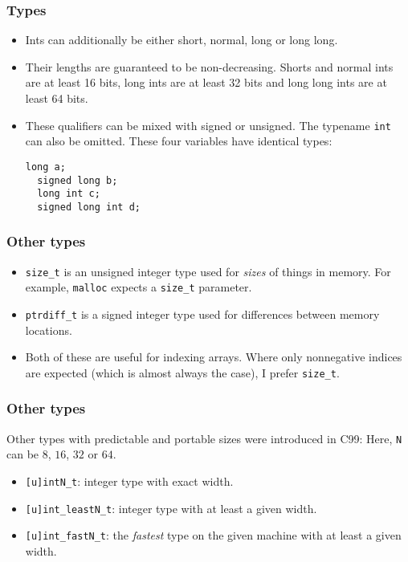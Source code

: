 \begin{frame}[fragile]
  \frametitle{Types}
  \begin{itemize}
  \item Ints can additionally be either short, normal, long or long long.
  \item Their lengths are guaranteed to be non-decreasing. Shorts and normal
    ints are at least 16 bits, long ints are at least 32 bits and long long ints
    are at least 64 bits.
  \item These qualifiers can be mixed with signed or unsigned. The typename
    \texttt{int} can also be omitted. These four variables have identical types:
    \begin{lstlisting}[style=c]
  long a;
  signed long b;
  long int c;
  signed long int d;
    \end{lstlisting}
  \end{itemize}
\end{frame}

\begin{frame}
  \frametitle{Other types}
  \begin{itemize}
  \item \texttt{size\_t} is an unsigned integer type used for \emph{sizes} of
    things in memory. For example, \texttt{malloc} expects a \texttt{size\_t}
    parameter.
  \item \texttt{ptrdiff\_t} is a signed integer type used for differences
    between memory locations.
  \item Both of these are useful for indexing arrays. Where only nonnegative
    indices are expected (which is almost always the case), I prefer
    \texttt{size\_t}.
  \end{itemize}
\end{frame}

\begin{frame}
  \frametitle{Other types}
  Other types with predictable and portable sizes were introduced in C99: Here,
  \texttt{N} can be $8$, $16$, $32$ or $64$.
  \begin{itemize}
  \item \texttt{[u]intN\_t}: integer type with exact width.
  \item \texttt{[u]int\_leastN\_t}: integer type with at least a given width.
  \item \texttt{[u]int\_fastN\_t}: the \emph{fastest} type on the given machine
    with at least a given width.
  \end{itemize}
\end{frame}

